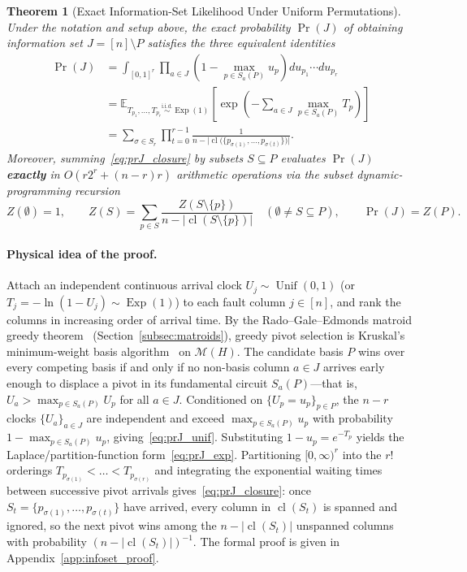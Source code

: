 \documentclass[12pt]{article}
\newtheorem{theorem}{Theorem}
\theoremstyle{definition}
\newcommand{\E}{\mathbb{E}}
\DeclareMathOperator{\cl}{cl}
\DeclareMathOperator{\Unif}{Unif}
\DeclareMathOperator{\Exp}{Exp}
\begin{document}
\begin{theorem}[Exact Information-Set Likelihood Under Uniform Permutations]\label{thm:infoset_likelihood}
Under the notation and setup above, the exact probability $\Pr(J)$ of obtaining information set $J = [n] \setminus
P$ satisfies the three equivalent identities
\begin{align}
  \Pr(J)
  &= \int_{[0, 1]^r} \prod_{a \in J} \left(1 - \max_{p \in S_a(P)} u_p\right) du_{p_1} \cdots du_{p_r}
     \label{eq:prJ_unif} \\
  &= \E_{T_{p_1}, \dots, T_{p_r} \stackrel{\mathrm{i.i.d.}}{\sim} \Exp(1)}
     \left[ \exp\!\left( - \sum_{a \in J} \max_{p \in S_a(P)} T_p \right) \right]
     \label{eq:prJ_exp} \\
  &= \sum_{\sigma \in S_r} \prod_{t=0}^{r-1}
     \frac{1}{n - \bigl|\cl\bigl(\{p_{\sigma(1)}, \dots, p_{\sigma(t)}\}\bigr)\bigr|}.
     \label{eq:prJ_closure}
\end{align}
Moreover, summing~\eqref{eq:prJ_closure} by subsets $S \subseteq P$ evaluates $\Pr(J)$ \textbf{exactly} in $O(r
2^r + (n-r) r)$ arithmetic operations via the subset dynamic-programming recursion
\begin{equation}\label{eq:dp_recursion}
  Z(\emptyset) = 1, \qquad
  Z(S) = \sum_{p \in S} \frac{Z(S \setminus \{p\})}{n - |\cl(S \setminus \{p\})|} \quad (\emptyset \neq S \subseteq
    P),
  \qquad \Pr(J) = Z(P).
\end{equation}
\end{theorem}

\paragraph{Physical idea of the proof.}
Attach an independent continuous arrival clock $U_j \sim \Unif(0, 1)$ (or $T_j = -\ln(1 - U_j) \sim \Exp(1)$) to
each fault column $j \in [n]$, and rank the columns in increasing order of arrival time. By the
Rado--Gale--Edmonds matroid greedy theorem~\cite{Rado1957,Gale1968,Edmonds1971} (Section~\ref{subsec:matroids}),
greedy pivot selection is Kruskal's minimum-weight basis algorithm~\cite{Kruskal1956} on $\mathcal{M}(H)$. The
candidate basis $P$ wins over every competing basis if and only if no non-basis column $a \in J$ arrives early
enough to displace a pivot in its fundamental circuit $S_a(P)$---that is, $U_a > \max_{p \in S_a(P)} U_p$ for all
$a \in J$. Conditioned on $\{U_p = u_p\}_{p \in P}$, the $n - r$ clocks $\{U_a\}_{a \in J}$ are independent and
exceed $\max_{p \in S_a(P)} u_p$ with probability $1 - \max_{p \in S_a(P)} u_p$, giving~\eqref{eq:prJ_unif}.
Substituting $1 - u_p = e^{-T_p}$ yields the Laplace/partition-function form~\eqref{eq:prJ_exp}. Partitioning $[0,
\infty)^r$ into the $r!$ orderings $T_{p_{\sigma(1)}} < \dots < T_{p_{\sigma(r)}}$ and integrating the exponential
waiting times between successive pivot arrivals gives~\eqref{eq:prJ_closure}: once $S_t = \{p_{\sigma(1)}, \dots,
p_{\sigma(t)}\}$ have arrived, every column in $\cl(S_t)$ is spanned and ignored, so the next pivot wins among the
$n - |\cl(S_t)|$ unspanned columns with probability $(n - |\cl(S_t)|)^{-1}$. The formal proof is given in
Appendix~\ref{app:infoset_proof}.
\end{document}
